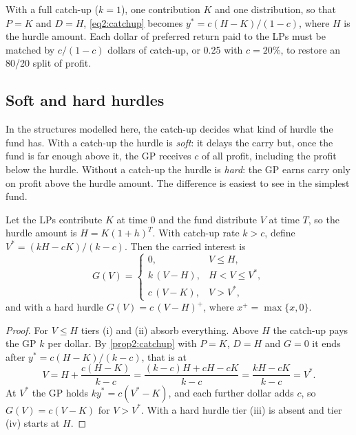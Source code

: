 \begin{chapterrefs}
With a full catch-up ($k = 1$), one contribution $K$ and one distribution, so that $P=K$ and
$D = H$, \cref{eq2:catchup} becomes
$y^{*} = c(H-K)/(1-c)$, where $H$ is the hurdle amount. Each dollar of preferred return paid to the LPs
must be matched by $c/(1-c)$ dollars of catch-up, or 0.25 with $c = 20\%$, to restore an 80/20
split of profit.

\subsection{Soft and hard hurdles}

In the structures modelled here, the catch-up decides what kind of hurdle the fund has. With a catch-up the hurdle is \emph{soft}: it
delays the carry but, once the fund is far enough above it, the GP receives $c$ of all profit, including
the profit below the hurdle. Without a catch-up the hurdle is \emph{hard}: the GP earns carry only on
profit above the hurdle amount. The difference is easiest to see in the simplest fund.

\begin{proposition}\label{prop2:single}
Let the LPs contribute $K$ at time 0 and the fund distribute $V$ at time $T$, so the hurdle amount is
$H = K(1+h)^T$. With catch-up rate $k>c$, define $V^{*} = (kH - cK)/(k-c)$. Then the carried interest is
\begin{equation}\label{eq2:gpcases}
  G(V) = \begin{cases}
    0, & V \le H,\\[2pt]
    k\,(V-H), & H < V \le V^{*},\\[2pt]
    c\,(V-K), & V > V^{*},
  \end{cases}
\end{equation}
and with a hard hurdle $G(V) = c\,(V-H)^{+}$, where $x^{+} = \max\{x,0\}$.
\end{proposition}
\begin{proof}
For $V\le H$ tiers (i) and (ii) absorb everything. Above $H$ the catch-up pays the GP $k$ per dollar.
By \cref{prop2:catchup} with $P=K$, $D = H$ and $G = 0$ it ends after $y^* = c(H-K)/(k-c)$, that is at
\begin{equation*}
  V = H + \frac{c(H-K)}{k-c} = \frac{(k-c)H + cH - cK}{k-c} = \frac{kH - cK}{k-c} = V^{*}.
\end{equation*} At $V^{*}$ the GP
holds $k y^{*} = c(V^{*}-K)$, and each further dollar adds $c$, so $G(V) = c(V-K)$ for $V > V^{*}$. With a
hard hurdle tier (iii) is absent and tier (iv) starts at $H$.
\end{proof}


\end{chapterrefs}
